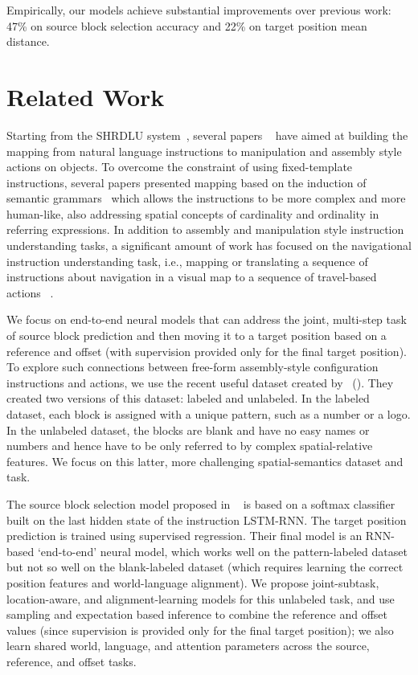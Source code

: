\documentclass[letterpaper]{article} %
\newcommand{\newcite}[1]{\citeauthor{#1} (\citeyear{#1})}
\begin{document}
Empirically, our models achieve substantial improvements over previous work: 47\% on source block selection accuracy and 22\% on target position mean distance.

\section{Related Work}


Starting from the SHRDLU system~\cite{winograd72}, several papers ~\cite{branavan2009reinforcement,howard2014natural,matuszek2014learning} have aimed at building the mapping from natural language instructions to manipulation and assembly style actions on objects.
To overcome the constraint of using fixed-template instructions, several papers presented mapping based on the induction of semantic grammars~\cite{zettlemoyer2005learning,tellex2011understanding,matuszek2012joint,misra2015environment,paul2016efficient} which allows the instructions to be more complex and more human-like, also addressing spatial concepts of cardinality and ordinality in referring expressions.
In addition to assembly and manipulation style instruction understanding tasks, a significant amount of work has focused on the navigational instruction understanding task, i.e., mapping or translating a sequence of instructions about navigation in a visual map to a sequence of travel-based actions~\cite{chen2011learning,artzi2013weakly,mei2015listen,andreas2015alignment} .

We focus on end-to-end neural models that can address the joint, multi-step task of source block prediction and then moving it to a target position based on a reference and offset (with supervision provided only for the final target position). To explore such connections between free-form assembly-style configuration instructions and  actions, we use the recent useful dataset created by~\newcite{bisk2016natural}. They created two versions of this dataset: labeled and unlabeled. In the labeled dataset, each block is assigned with a unique pattern, such as a number or a logo. In the unlabeled dataset, the blocks are blank and have no easy names or numbers and hence have to be only referred to by complex spatial-relative features. We focus on this latter, more challenging spatial-semantics dataset and task.

The source block selection model proposed in ~\cite{bisk2016natural} is based on a softmax classifier built on the last hidden state of the instruction LSTM-RNN. The target position prediction is trained using supervised regression.  Their final model is an RNN-based `end-to-end' neural model, which works well on the pattern-labeled dataset but not so well on the blank-labeled dataset (which requires learning the correct position features and world-language alignment). We propose joint-subtask, location-aware, and alignment-learning models for this unlabeled task, and use sampling and expectation based inference to combine the reference and offset values (since supervision is provided only for the final target position); we also learn shared world, language, and attention parameters across the source, reference, and offset tasks.
\end{document}
